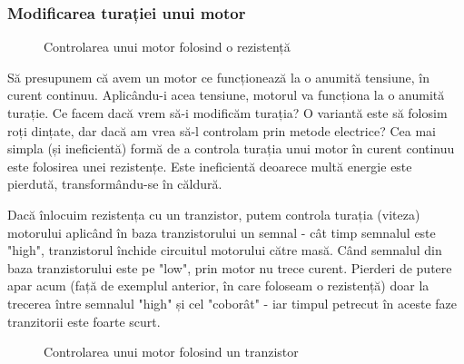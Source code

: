 \subsubsection{Modificarea turației unui motor}

\begin{figure}
    \vspace{-20pt}
    \vspace{-15pt}
    \caption{\label{fig:CodeWarrior-ResistenceMethod} Controlarea unui motor folosind o rezistență}
    \vspace{-10pt}
\end{figure}

Să presupunem că avem un motor ce funcționează la o anumită tensiune, în curent continuu. Aplicându-i acea tensiune, motorul va funcționa la o anumită turație. Ce facem dacă vrem să-i modificăm turația? O variantă este să folosim roți dințate, dar dacă am vrea să-l controlam prin metode electrice? Cea mai simpla (și ineficientă) formă de a controla turația unui motor în curent continuu este folosirea unei rezistențe. Este ineficientă deoarece multă energie este pierdută, transformându-se în căldură.

Dacă înlocuim rezistența cu un tranzistor, putem controla turația (viteza) motorului aplicând în baza tranzistorului un semnal - cât timp semnalul este "high", tranzistorul închide circuitul motorului către masă. Când semnalul din baza tranzistorului este pe "low", prin motor nu trece curent. Pierderi de putere apar acum (față de exemplul anterior, în care foloseam o rezistență) doar la trecerea între semnalul "high" și cel "coborât" - iar timpul petrecut în aceste faze tranzitorii este foarte scurt.

\begin{figure}
    \vspace{-60pt}
     \vspace{-15pt}
    \caption{\label{fig:CodeWarrior-TransistorMethod} Controlarea unui motor folosind un tranzistor}
    \vspace{-10pt}
\end{figure}

